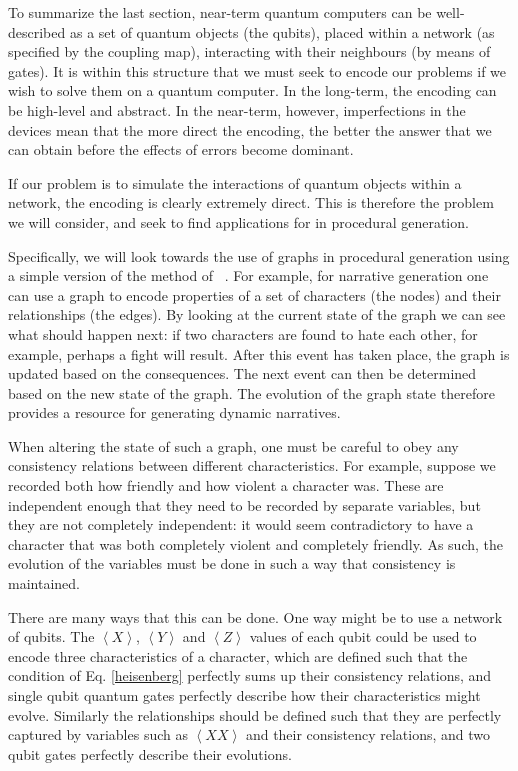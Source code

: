 \documentclass[conference]{IEEEtran}
\begin{document}
To summarize the last section, near-term quantum computers can be well-described as a set of quantum objects (the qubits), placed within a network (as specified by the coupling map), interacting with their neighbours (by means of gates). It is within this structure that we must seek to encode our problems if we wish to solve them on a quantum computer. In the long-term, the encoding can be high-level and abstract. In the near-term, however, imperfections in the devices mean that the more direct the encoding, the better the answer that we can obtain before the effects of errors become dominant.

If our problem is to simulate the interactions of quantum objects within a network, the encoding is clearly extremely direct. This is therefore the problem we will consider, and seek to find applications for in procedural generation.

Specifically, we will look towards the use of graphs in procedural generation using a simple version of the method of ~\cite{kybartas:14}. For example, for narrative generation one can use a graph to encode properties of a set of characters (the nodes) and their relationships (the edges). By looking at the current state of the graph we can see what should happen next: if two characters are found to hate each other, for example, perhaps a fight will result. After this event has taken place, the graph is updated based on the consequences. The next event can then be determined based on the new state of the graph. The evolution of the graph state therefore provides a resource for generating dynamic narratives.

When altering the state of such a graph, one must be careful to obey any consistency relations between different characteristics. For example, suppose we recorded both how friendly and how violent a character was. These are independent enough that they need to be recorded by separate variables, but they are not completely independent: it would seem contradictory to have a character that was both completely violent and completely friendly. As such, the evolution of the variables must be done in such a way that consistency is maintained.

There are many ways that this can be done. One way might be to use a network of qubits. The $\left\langle X\right\rangle$, $\left\langle Y\right\rangle$ and $\left\langle Z\right\rangle$  values of each qubit could be used to encode three characteristics of a character, which are defined such that the condition of Eq. \ref{heisenberg} perfectly sums up their consistency relations, and single qubit quantum gates perfectly describe how their characteristics might evolve. Similarly the relationships should be defined such that they are perfectly captured by variables such as $\left\langle XX \right\rangle$ and their consistency relations, and two qubit gates perfectly describe their evolutions.
\end{document}
